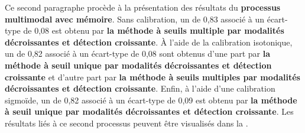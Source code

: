 Ce second paragraphe procède à la présentation des résultats du \textbf{processus multimodal avec mémoire}. Sans calibration, un \fscore{} de 0,83 associé à un écart-type de 0,08 est obtenu par \textbf{la méthode à seuils multiple par modalités décroissantes et détection croissante}. À l'aide de la calibration isotonique, un \fscore{} de 0,82 associé à un écart-type de 0,08 sont obtenus d'une part par \textbf{la méthode à seuil unique par modalités décroissantes et détection croissante} et d'autre part par \textbf{la méthode à seuils multiples par modalités décroissantes et détection croissante}. Enfin, à l'aide d'une calibration sigmoïde, un \fscore{} de 0,82 associé à un écart-type de 0,09 est obtenu par \textbf{la méthode à seuil unique par modalités décroissantes et détection croissante}. Les résultats liés à ce second processus peuvent être visualisés dans la .\par

